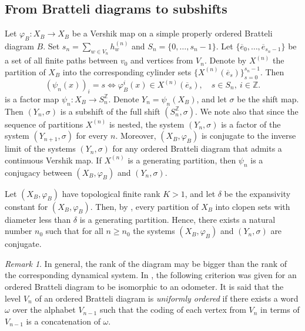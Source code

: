 \documentclass[11pt, english, reqno]{amsart}
\theoremstyle{definition}
\theoremstyle{remark}
\newtheorem{remar}[defin]{Remark}
\theoremstyle{plain}
\def\ov{\overline}
\numberwithin{equation}{section}
\begin{document}
{\subsection{From Bratteli diagrams to subshifts}
Let $\varphi_B \colon X_B \rightarrow X_B$ be a Vershik map on a simple
properly ordered Bratteli diagram $B$. Set $s_n = \sum_{w \in V_n}
h_{w}^{(n)}$ and $S_n = \{0, \ldots, s_n - 1\}$. Let $\{\ov e_0, \ldots,
 \ov e_{s_n - 1}\}$ be a set of all
finite paths between $v_0$ and vertices from $V_n$. Denote by $X^{(n)}$
the partition of $X_B$ into the corresponding cylinder sets $\{X^{(n)}(\ov
e_s)\}_{s = 0}^{s_n - 1}$.
 Then
\begin{equation}\label{nfactorsubshift}
(\psi_n(x))_i = s \Leftrightarrow \varphi_B^i(x) \in X^{(n)}(\ov e_s),
 \quad s\in S_n,\ i \in \mathbb{Z}.
\end{equation}
 is a factor map $\psi_n \colon X_B \rightarrow S_n^{\mathbb{Z}}$.
 Denote $Y_n = \psi_n(X_B)$,
and let $\sigma$ be the shift map. Then $(Y_n, \sigma)$ is a subshift of the
full shift $(S_n^{\mathbb{Z}}, \sigma)$. We note also that since the
sequence of  partitions
$X^{(n)}$ is nested, the system $(Y_n, \sigma)$ is a factor of the system
$(Y_{n+1}, \sigma)$ for every $n$. Moreover, $(X_B, \varphi_B)$ is
conjugate  to
the inverse limit of the systems $(Y_n, \sigma)$ for any ordered Bratteli
diagram that admits a continuous Vershik map. If $X^{(n)}$ is a generating
partition, then $\psi_n$ is a conjugacy  between $(X_B, \varphi_B)$ and
$(Y_n, \sigma)$.

Let $(X_B, \varphi_B)$ have topological finite rank $K > 1$, and let
$\delta$ be the expansivity constant for $(X_B, \varphi_B)$. Then, by
\cite{Hedlund1969}, every partition of $X_B$ into  clopen sets with
diameter less than $\delta$ is a generating partition. Hence, there exists a
natural number $n_0$ such that for all $n \geq n_0$ the systems $(X_B,
\varphi_B)$ and $(Y_n, \sigma)$ are conjugate.

\begin{remar}
In general, the rank of the diagram may be bigger than the rank of the
corresponding dynamical system. In \cite{FrickPetersenShields2017}, the
following criterion was given for an ordered Bratteli diagram to be isomorphic
to an odometer. It is said that the level $V_n$ of an ordered Bratteli
diagram is\textit{ uniformly ordered} if there exists a word $\omega$ over
the alphabet $V_{n-1}$ such that the coding of each vertex from $V_n$ in
terms of  $V_{n-1}$ is a concatenation of $\omega$.
\end{remar}

}
\end{document}
